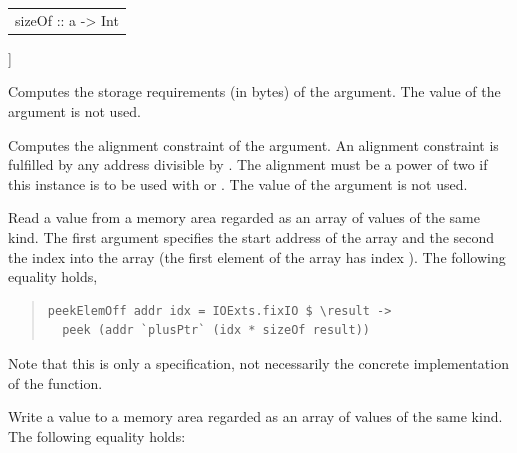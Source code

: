\begin{haddockdesc}
{\begin{haddockdesc}
\begin{tabular}{@{}l}
sizeOf :: a -> Int
\end{tabular}]
{\haddockbegindoc
Computes the storage requirements (in bytes) of the argument.
 The value of the argument is not used.\par}
\end{haddockdesc}
\begin{haddockdesc}
\item[\begin{tabular}{@{}l}
alignment :: a -> Int
\end{tabular}]
{\haddockbegindoc
Computes the alignment constraint of the argument.  An
 alignment constraint  is fulfilled by any address divisible
 by . The alignment must be a power of two if this instance
 is to be used with  or .  The value of
 the argument is not used.\par}
\end{haddockdesc}
\begin{haddockdesc}
\item[\begin{tabular}{@{}l}
peekElemOff :: Ptr a -> Int -> IO a
\end{tabular}]
{\haddockbegindoc
Read a value from a memory area regarded as an array
         of values of the same kind.  The first argument specifies
         the start address of the array and the second the index into
         the array (the first element of the array has index
         ).  The following equality holds,\par
\begin{quote}
{\haddockverb\begin{verbatim}
peekElemOff addr idx = IOExts.fixIO $ \result ->
  peek (addr `plusPtr` (idx * sizeOf result))\end{verbatim}}
\end{quote}
Note that this is only a specification, not
         necessarily the concrete implementation of the
         function.\par}
\end{haddockdesc}
\begin{haddockdesc}
\item[\begin{tabular}{@{}l}
pokeElemOff :: Ptr a -> Int -> a -> IO ()
\end{tabular}]
{\haddockbegindoc
Write a value to a memory area regarded as an array of
         values of the same kind.  The following equality holds:\par
\begin{quote}

\end{quote}}
\end{haddockdesc}}
\end{haddockdesc}
